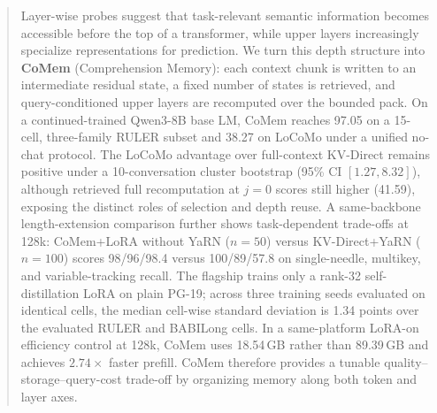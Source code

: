 \begin{abstract}
Layer-wise probes suggest that task-relevant semantic information becomes
accessible before the top of a transformer, while upper layers increasingly
specialize representations for prediction. We turn this depth structure into
\textbf{CoMem} (Comprehension Memory): each context chunk is written to an
intermediate residual state, a fixed number of states is retrieved, and
query-conditioned upper layers are recomputed over the bounded pack. On a
continued-trained Qwen3-8B base LM, CoMem reaches 97.05 on a 15-cell,
three-family RULER subset and 38.27 on LoCoMo under a unified no-chat protocol.
The LoCoMo advantage over full-context KV-Direct remains positive under a
10-conversation cluster bootstrap (95\% CI $[1.27,8.32]$), although retrieved
full recomputation at $j{=}0$ scores still higher (41.59), exposing the distinct
roles of selection and depth reuse. A same-backbone length-extension comparison further shows task-dependent
trade-offs at 128k: CoMem+LoRA without YaRN ($n{=}50$) versus KV-Direct+YaRN
($n{=}100$) scores 98/96/98.4 versus 100/89/57.8 on single-needle, multikey,
and variable-tracking recall. The flagship trains only a rank-32 self-distillation LoRA on plain PG-19;
across three training seeds evaluated on identical cells, the median cell-wise
standard deviation is 1.34 points over the evaluated RULER and BABILong cells. In a same-platform
LoRA-on efficiency control at 128k, CoMem uses 18.54\,GB rather than 89.39\,GB
and achieves $2.74\times$ faster prefill. CoMem therefore provides a tunable
quality--storage--query-cost trade-off by organizing memory along both token and
layer axes.
\end{abstract}
